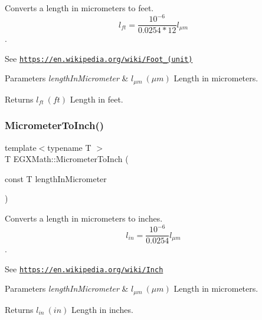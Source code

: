 Converts a length in micrometers to feet. \[ l_{ft}= \frac{10^{-6}}{0.0254 * 12} l_{\mu m} \]. 

See \href{https://en.wikipedia.org/wiki/Foot_(unit)}{\tt https\+://en.\+wikipedia.\+org/wiki/\+Foot\+\_\+(unit)} 
\begin{DoxyParams}{Parameters}
{\em length\+In\+Micrometer} & $ l_{\mu m}\ (\mu m)$ Length in micrometers. \\
\hline
\end{DoxyParams}
\begin{DoxyReturn}{Returns}
$ l_{ft}\ (ft)$ Length in feet. 
\end{DoxyReturn}
\mbox{\label{group___e_g_x_math-_conversions-_length_conversions-_s_i-_micrometer-_imperial_gad372acac36a8ca7f56b26858dd01546b}} 
\subsubsection{\texorpdfstring{Micrometer\+To\+Inch()}{MicrometerToInch()}}
{\footnotesize\ttfamily template$<$typename T $>$ \\
T E\+G\+X\+Math\+::\+Micrometer\+To\+Inch (\begin{DoxyParamCaption}\item[{const T}]{length\+In\+Micrometer }\end{DoxyParamCaption})}



Converts a length in micrometers to inches. \[ l_{in}= \frac{10^{-6}}{0.0254} l_{\mu m} \]. 

See \href{https://en.wikipedia.org/wiki/Inch}{\tt https\+://en.\+wikipedia.\+org/wiki/\+Inch} 
\begin{DoxyParams}{Parameters}
{\em length\+In\+Micrometer} & $ l_{\mu m}\ (\mu m)$ Length in micrometers. \\
\hline
\end{DoxyParams}
\begin{DoxyReturn}{Returns}
$ l_{in}\ (in)$ Length in inches. 
\end{DoxyReturn}
\mbox{\label{group___e_g_x_math-_conversions-_length_conversions-_s_i-_micrometer-_imperial_ga94d0f5a6ba598898a13e3a8837d7c681}} 
